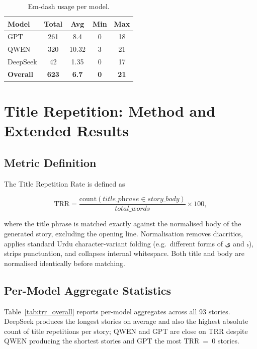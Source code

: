\documentclass[11pt]{article}
\begin{document}
\begin{table}[ht]
\centering\small
\caption{Em-dash usage per model.}
\label{tab:em_dash}
\begin{tabular}{lcccc}
\toprule
\textbf{Model} & \textbf{Total} & \textbf{Avg} &\textbf{Min} &\textbf{Max} \\
\midrule
GPT      & 261 & 8.4 & 0 & 18 \\
QWEN     & 320 & 10.32 & 3&21 \\
DeepSeek & 42 & 1.35 & 0&17 \\
\midrule
\textbf{Overall} & \textbf{623} & \textbf{6.7} & 
\textbf{0}&
\textbf{21} \\
\bottomrule
\end{tabular}
\end{table}

\section{Title Repetition: Method and Extended Results}
\label{app:TPR}

\subsection{Metric Definition}
\label{app:trr_method}

The Title Repetition Rate is defined as

\begin{equation}
    \mathrm{TRR} =
        \frac{\mathrm{count}(\textit{title\_phrase}
                             \in \textit{story\_body})}
             {\textit{total\_words}} \times 100,
\end{equation}

where the title phrase is matched exactly against the
normalised body of the generated story, excluding the
opening line. Normalisation removes diacritics, applies
standard Urdu character-variant folding (e.g.\ different
forms of \foreignlanguage{arabic}{ی} and
\foreignlanguage{arabic}{ہ}), strips punctuation, and
collapses internal whitespace. Both title and body are
normalised identically before matching.

\subsection{Per-Model Aggregate Statistics}
\label{app:trr_overall}

Table~\ref{tab:trr_overall} reports per-model aggregates
across all 93 stories. DeepSeek produces the longest
stories on average and also the highest absolute count of
title repetitions per story; QWEN and GPT are close on
TRR despite QWEN producing the shortest stories and GPT
the most TRR~=~0 stories.
\end{document}
